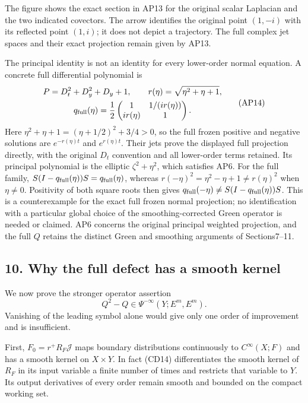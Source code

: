 \documentclass[
  11pt,
]{article}
\begin{document}
The figure shows the exact section in AP13 for the original scalar
Laplacian and the two indicated covectors. The arrow identifies the
original point \((1,-i)\) with its reflected point \((1,i)\); it does
not depict a trajectory. The full complex jet spaces and their exact
projection remain given by AP13.

The principal identity is not an identity for every lower-order normal
equation. A concrete full differential polynomial is \[
 \begin{gathered}
 P=D_t^2+D_y^2+D_y+1,\qquad
 r(\eta)=\sqrt{\eta^2+\eta+1},\\
 q_{\rm full}(\eta)=\frac12\begin{pmatrix}1&1/(i r(\eta))\\ i r(\eta)&1\end{pmatrix}.
 \end{gathered}
 \tag{AP14}
\] Here \(\eta^2+\eta+1=(\eta+1/2)^2+3/4>0\), so the full frozen
positive and negative solutions are \(e^{-r(\eta)t}\) and
\(e^{r(\eta)t}\). Their jets prove the displayed full projection
directly, with the original \(D_t\) convention and all lower-order terms
retained. Its principal polynomial is the elliptic \(\zeta^2+\eta^2\),
which satisfies AP6. For the full family,
\(S(I-q_{\rm full}(\eta))S=q_{\rm full}(\eta)\), whereas
\(r(-\eta)^2=\eta^2-\eta+1\ne r(\eta)^2\) when \(\eta\ne0\). Positivity
of both square roots then gives
\(q_{\rm full}(-\eta)\ne S(I-q_{\rm full}(\eta))S\). This is a
counterexample for the exact full frozen normal projection; no
identification with a particular global choice of the
smoothing-corrected Green operator is needed or claimed. AP6 concerns
the original principal weighted projection, and the full \(Q\) retains
the distinct Green and smoothing arguments of Sections7--11.

\subsection{10. Why the full defect has a smooth
kernel}\label{why-the-full-defect-has-a-smooth-kernel}

We now prove the stronger operator assertion \[
Q^2-Q\in\Psi^{-\infty}(Y;E^m,E^m).
\tag{CD27}
\] Vanishing of the leading symbol alone would give only one order of
improvement and is insufficient.

First, \(F_0= r^+R_F\mathcal J\) maps boundary distributions
continuously to \(C^\infty(X;F)\) and has a smooth kernel on
\(X\times Y\). In fact (CD14) differentiates the smooth kernel of
\(R_F\) in its input variable a finite number of times and restricts
that variable to \(Y\). Its output derivatives of every order remain
smooth and bounded on the compact working set.
\end{document}
